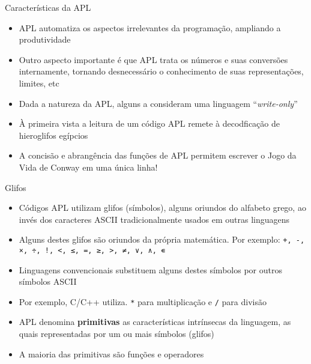 \begin{frame}[fragile]{Características da APL}

    \begin{itemize}
        \item APL automatiza os aspectos irrelevantes da programação, ampliando a produtividade
        \pause

        \item Outro aspecto importante é que APL trata os números e suas conversões internamente, tornando desnecessário o conhecimento de suas representações, limites, etc
        \pause

        \item Dada a natureza da APL, alguns a consideram uma linguagem ``\textit{write-only}''
        \pause

        \item À primeira vista a leitura de um código APL remete à decodficação de hieroglifos egípcios
        \pause

        \item A concisão e abrangência das funções de APL permitem escrever o Jogo da Vida de Conway em uma única linha!
        \pause

    \end{itemize}

\end{frame}

\begin{frame}[fragile]{Glifos}

    \begin{itemize}
        \item Códigos APL utilizam glifos (símbolos), alguns oriundos do alfabeto grego, ao invés dos caracteres ASCII tradicionalmente usados em outras linguagens
        \pause

        \item Alguns destes glifos são oriundos da própria matemática. Por exemplo: \texttt{+, -, ×, ÷, !, <, ≤, =, ≥, >, ≠, ∨, ∧, ∊}
        \pause

        \item Linguagens convencionais substituem alguns destes símbolos por outros símbolos ASCII
        \pause


        \item Por exemplo, C/C++ utiliza. \texttt{*} para multiplicação e  \texttt{/} para divisão
        \pause

        \item APL denomina \textbf{primitivas} as características intrínsecas da linguagem, as quais representadas por um ou mais símbolos (glifos)
        \pause

        \item A maioria das primitivas são funções e operadores
    \end{itemize}

\end{frame}

